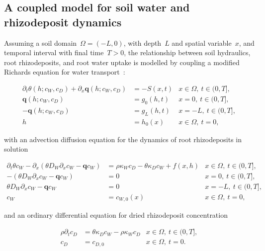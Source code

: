 \documentclass[11pt,a4paper]{article}
\numberwithin{equation}{section}
\begin{document}
\subsection{A coupled model for soil water and rhizodeposit dynamics}\label{subsec: models}  
Assuming a soil domain~$\Omega = (-L, 0)$, with depth~$L$ and spatial variable~$x$, and temporal interval with final time~$T>0$, the relationship between soil hydraulics, root rhizodeposits, and root water uptake is modelled by coupling a modified Richards equation for water transport~\citep{richards1931capillary}:
\begin{linenomath*}
	\begin{equation}\label{model: water transport}
		\begin{aligned}
			\partial_t\theta(h; c_W, c_D) + \partial_x\mathbf{q}(h; c_W, c_D) &= - S(x,t) &x\in\Omega,~t\in(0, T],\\
			\mathbf{q}(h; c_W, c_D) &= g_0(h,t) &x = 0,~t\in(0, T],\\  
			-\mathbf{q}(h; c_W, c_D) &= g_L(h,t) &x = -L,~t\in(0, T],\\
			h &= h_0(x) & x\in\Omega,~t=0, 
		\end{aligned}
	\end{equation}
\end{linenomath*}	
with an advection diffusion equation for the dynamics of root rhizodeposits in solution
\begin{linenomath*}
	\begin{equation}\label{model: rhizodeposits in solution}
		\begin{aligned}
			\partial_t{\theta c_W} - \partial_x(\theta D_W\partial_xc_W - \mathbf{q}c_W) &= \rho\kappa_Wc_D - \theta\kappa_Dc_W + f(x, h)  
			&x\in\Omega,~t\in(0, T],\\
			 - (\theta D_W\partial_xc_W - \mathbf{q}c_W)&= 0 &x = 0,~t\in(0, T],\\
			 \theta D_W\partial_xc_W - \mathbf{q}c_W&= 0 &x = -L,~t\in(0, T],\\  
			 c_W & = c_{W,0}(x) &x\in\Omega,~t=0,	 
		\end{aligned}
	\end{equation}
\end{linenomath*}
and an ordinary differential equation for dried rhizodeposit concentration  
\begin{linenomath*}
	\begin{equation}\label{model: dried rhizodeposits}
		\begin{aligned}
			\rho\partial_tc_D &= \theta\kappa_Dc_W - \rho\kappa_Wc_D &x\in\Omega,~t\in(0, T],\\
			c_D & = c_{D,0} &x\in\Omega,~t=0.
		\end{aligned}
	\end{equation}
\end{linenomath*}
\end{document}
